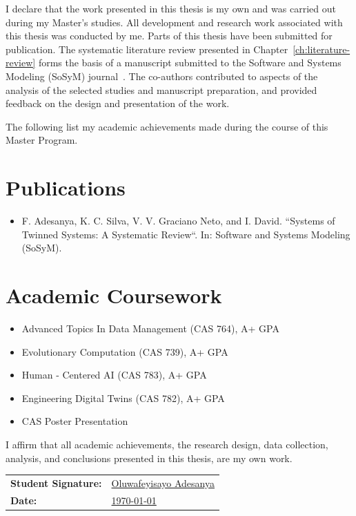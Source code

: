 I declare that the work presented in this thesis is my own and was carried out during my Master's studies. All development and research work associated with this thesis was conducted by me. Parts of this thesis have been submitted for publication. The systematic literature review presented in Chapter~\ref{ch:literature-review} forms the basis of a manuscript submitted to the Software and Systems Modeling (SoSyM) journal~\cite{adesanya2025systems}. The co-authors contributed to aspects of the analysis of the selected studies and manuscript preparation, and provided feedback on the design and presentation of the work.

The following list my academic achievements made during the course of this Master Program.

\section*{Publications}

\begin{itemize}
    \item F. Adesanya, K. C. Silva, V. V. Graciano Neto, and I. David. ``Systems of Twinned Systems: A Systematic Review``. In: Software and Systems Modeling (SoSyM).  %

\end{itemize}

\section*{Academic Coursework}

\begin{itemize}
    \item Advanced Topics In Data Management (CAS 764), A+ GPA
    \item Evolutionary Computation (CAS 739), A+ GPA
    \item Human - Centered AI (CAS 783), A+ GPA
    \item Engineering Digital Twins (CAS 782), A+ GPA
    \item CAS Poster Presentation 
\end{itemize}

I affirm that all academic achievements, the research design, data collection, analysis, and conclusions presented in this thesis, are my own work. 


\vspace{1cm}


\noindent
\begin{tabular}{@{}l p{\dimexpr\linewidth-4cm}@{}}
\textbf{Student Signature:}              & \underline{\hspace{2mm}Oluwafeyisayo Adesanya\hspace{2mm}} \\
\textbf{Date:}              & \underline{\hspace{2mm}\today\hspace{2mm}} \\
\end{tabular}